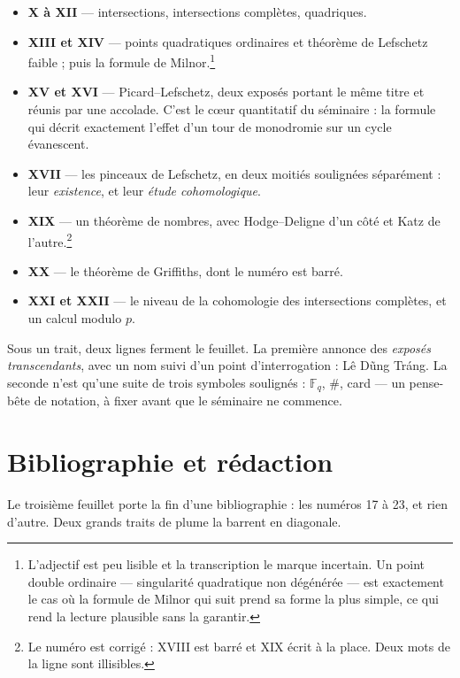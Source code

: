 \documentclass[11pt,a4paper]{article}
\begin{document}
\begin{itemize}
\item \textbf{X à XII} --- intersections, intersections complètes, quadriques.
\item \textbf{XIII et XIV} --- points quadratiques ordinaires et théorème de
Lefschetz faible ; puis la formule de Milnor.\footnote{L'adjectif est peu
lisible et la transcription le marque incertain. Un point double ordinaire
--- singularité quadratique non dégénérée --- est exactement le cas où la
formule de Milnor qui suit prend sa forme la plus simple, ce qui rend la
lecture plausible sans la garantir.}
\item \textbf{XV et XVI} --- Picard--Lefschetz, deux exposés portant le même
titre et réunis par une accolade. C'est le cœur quantitatif du séminaire :
la formule qui décrit exactement l'effet d'un tour de monodromie sur un cycle
évanescent.
\item \textbf{XVII} --- les pinceaux de Lefschetz, en deux moitiés soulignées
séparément : leur \emph{existence}, et leur \emph{étude cohomologique}.
\item \textbf{XIX} --- un théorème de nombres, avec Hodge--Deligne d'un côté et
Katz de l'autre.\footnote{Le numéro est corrigé : XVIII est barré et XIX écrit
à la place. Deux mots de la ligne sont illisibles.}
\item \textbf{XX} --- le théorème de Griffiths, dont le numéro est barré.
\item \textbf{XXI et XXII} --- le niveau de la cohomologie des intersections
complètes, et un calcul modulo $p$.
\end{itemize}

Sous un trait, deux lignes ferment le feuillet. La première annonce des
\emph{exposés transcendants}, avec un nom suivi d'un point d'interrogation :
Lê Dũng Tráng. La seconde n'est qu'une suite de trois symboles soulignés :
$\mathbb{F}_{q}$, $\#$, card --- un pense-bête de notation, à fixer avant que le
séminaire ne commence.

\section*{Bibliographie et rédaction}

Le troisième feuillet porte la fin d'une bibliographie : les numéros 17 à 23,
et rien d'autre. Deux grands traits de plume la barrent en diagonale.
\end{document}
